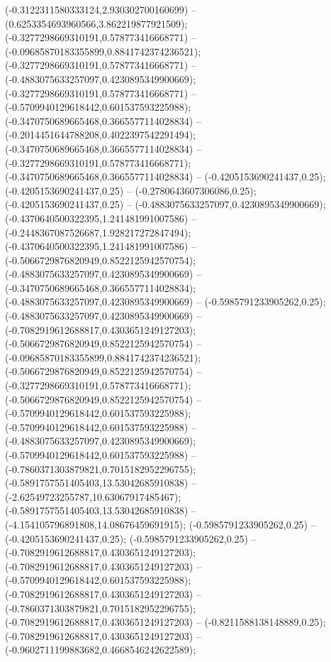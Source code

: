  (-0.3122311580333124,2.930302700160699) -- (0.6253354693960566,3.862219877921509);
 (-0.3277298669310191,0.578773416668771) -- (-0.09685870183355899,0.8841742374236521);
 (-0.3277298669310191,0.578773416668771) -- (-0.4883075633257097,0.4230895349900669);
 (-0.3277298669310191,0.578773416668771) -- (-0.5709940129618442,0.601537593225988);
 (-0.3470750689665468,0.3665577114028834) -- (-0.2014451644788208,0.4022397542291494);
 (-0.3470750689665468,0.3665577114028834) -- (-0.3277298669310191,0.578773416668771);
 (-0.3470750689665468,0.3665577114028834) -- (-0.4205153690241437,0.25);
 (-0.4205153690241437,0.25) -- (-0.2780643607306086,0.25);
 (-0.4205153690241437,0.25) -- (-0.4883075633257097,0.4230895349900669);
 (-0.4370640500322395,1.241481991007586) -- (-0.2448367087526687,1.928217272847494);
 (-0.4370640500322395,1.241481991007586) -- (-0.5066729876820949,0.8522125942570754);
 (-0.4883075633257097,0.4230895349900669) -- (-0.3470750689665468,0.3665577114028834);
 (-0.4883075633257097,0.4230895349900669) -- (-0.5985791233905262,0.25);
 (-0.4883075633257097,0.4230895349900669) -- (-0.7082919612688817,0.4303651249127203);
 (-0.5066729876820949,0.8522125942570754) -- (-0.09685870183355899,0.8841742374236521);
 (-0.5066729876820949,0.8522125942570754) -- (-0.3277298669310191,0.578773416668771);
 (-0.5066729876820949,0.8522125942570754) -- (-0.5709940129618442,0.601537593225988);
 (-0.5709940129618442,0.601537593225988) -- (-0.4883075633257097,0.4230895349900669);
 (-0.5709940129618442,0.601537593225988) -- (-0.7860371303879821,0.7015182952296755);
 (-0.5891757551405403,13.53042685910838) -- (-2.62549723255787,10.63067917485467);
 (-0.5891757551405403,13.53042685910838) -- (-4.154105796891808,14.08676459691915);
 (-0.5985791233905262,0.25) -- (-0.4205153690241437,0.25);
 (-0.5985791233905262,0.25) -- (-0.7082919612688817,0.4303651249127203);
 (-0.7082919612688817,0.4303651249127203) -- (-0.5709940129618442,0.601537593225988);
 (-0.7082919612688817,0.4303651249127203) -- (-0.7860371303879821,0.7015182952296755);
 (-0.7082919612688817,0.4303651249127203) -- (-0.8211588138148889,0.25);
 (-0.7082919612688817,0.4303651249127203) -- (-0.9602711199883682,0.4668546242622589);
